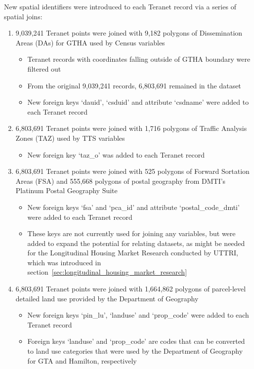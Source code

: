 New spatial identifiers were introduced to each Teranet record via a series of spatial joins:
\begin{enumerate}
    \item 9,039,241 Teranet points were joined with 9,182 polygons of Dissemination Areas (DAs) for GTHA used by Census variables
    \begin{itemize}
        \item Teranet records with coordinates falling outside of GTHA boundary were filtered out
        \item From the original 9,039,241 records, 6,803,691 remained in the dataset
        \item New foreign keys `dauid', `csduid' and attribute `csdname' were added to each Teranet record
    \end{itemize}
    \item 6,803,691 Teranet points were joined with 1,716 polygons of Traffic Analysis Zones (TAZ) used by TTS variables
    \begin{itemize}
        \item New foreign key `taz\_o' was added to each Teranet record
    \end{itemize}
    \item 6,803,691 Teranet points were joined with 525 polygons of Forward Sortation Areas (FSA) and 555,668 polygons of postal geography from DMTI's Platinum Postal Geography Suite
    \begin{itemize}
        \item New foreign keys `fsa' and `pca\_id' and attribute `postal\_code\_dmti' were added to each Teranet record
        \item These keys are not currently used for joining any variables, but were added to expand the potential for relating datasets, as might be needed for the Longitudinal Housing Market Research conducted by UTTRI, which was introduced in section~\ref{sec:longitudinal_housing_market_research}
    \end{itemize}
    \item 6,803,691 Teranet points were joined with 1,664,862 polygons of parcel-level detailed land use provided by the Department of Geography
    \begin{itemize}
        \item New foreign keys `pin\_lu', `landuse' and `prop\_code' were added to each Teranet record
        \item Foreign keys `landuse' and `prop\_code' are codes that can be converted to land use categories that were used by the Department of Geography for GTA and Hamilton, respectively

\end{itemize}
\end{enumerate}
